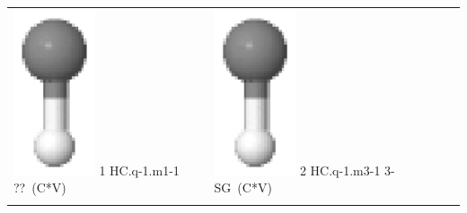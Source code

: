 \documentclass[10pt]{article}
\begin{document}
\vspace{0.5cm}
\begin{tabular}{|
>{\centering\arraybackslash}p{2.40000000000000000000cm}|
>{\centering\arraybackslash}p{2.40000000000000000000cm}|
>{\centering\arraybackslash}p{2.40000000000000000000cm}|
>{\centering\arraybackslash}p{2.40000000000000000000cm}|
>{\centering\arraybackslash}p{2.40000000000000000000cm}|
}
\hline
\multicolumn{2}{|c|}{HC} \\\hline
\includegraphics[width=2.40000000000000000000cm]{HC.q-1.m1-1.eps} \tiny{1 \hspace{1.20000000000000000000cm} HC.q-1.m1-1 \hspace{5pt} ??~(C*V)} &
\includegraphics[width=2.40000000000000000000cm]{HC.q-1.m3-1.eps} \tiny{2 \hspace{1.20000000000000000000cm} HC.q-1.m3-1 \hspace{5pt} 3-SG~(C*V)} 
\\\cline{1-2}
\end{tabular}
\end{document}
